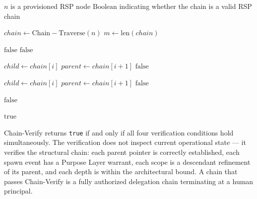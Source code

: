 \begin{algorithm}
\caption{Chain-Verify($n$) --- Verify the authorization chain from node $n$ to human anchor}
\label{alg:chain-verify}
\begin{algorithmic}[1]
\REQUIRE $n$ is a provisioned RSP node
\ENSURE $\mathrm{Boolean}$ indicating whether the chain is a valid RSP chain

\STATE $chain \leftarrow \mathrm{Chain-Traverse}(n)$
\STATE $m \leftarrow \mathrm{len}(chain)$

\STATE {}
    \STATE \RETURN $\mathrm{false}$ 
\ENDIF
{}
    \STATE \RETURN $\mathrm{false}$ 
\ENDIF

\STATE {}
    \STATE $child \leftarrow chain[i]$
    \STATE $parent \leftarrow chain[i+1]$
        \STATE \RETURN $\mathrm{false}$ 
    \ENDIF
\ENDFOR

\STATE {}
    \STATE $child \leftarrow chain[i]$
    \STATE $parent \leftarrow chain[i+1]$
        \STATE \RETURN $\mathrm{false}$ 
    \ENDIF
\ENDFOR

\STATE {}
        \STATE \RETURN $\mathrm{false}$ 
    \ENDIF
\ENDFOR

\RETURN $\mathrm{true}$
\end{algorithmic}
\end{algorithm}

Chain-Verify returns \texttt{true} if and only if all four verification conditions hold simultaneously. The verification does not inspect current operational state --- it verifies the structural chain: each parent pointer is correctly established, each spawn event has a Purpose Layer warrant, each scope is a descendant refinement of its parent, and each depth is within the architectural bound. A chain that passes Chain-Verify is a fully authorized delegation chain terminating at a human principal.

